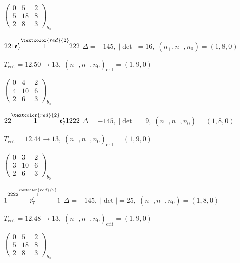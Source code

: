 \documentclass[10pt]{article}
\begin{document}
\hspace{2em}$\left(\begin{smallmatrix}0 & 5 & 2 \\ 5 & 18 & 8 \\ 2 & 8 & 3\end{smallmatrix}\right)_{\!b_0}$

\smallskip

$221\mathfrak{e}_7'\overset{\textcolor{red}{2}}{1}222$ \quad $\Delta=-145,\; |\det|=16,\; (n_+,n_-,n_0)=(1,8,0)$

\hspace{1em}$T_{\text{crit}}=12.50 \to 13,\; (n_+,n_-,n_0)_{\text{crit}}=(1,9,0)$

\hspace{2em}$\left(\begin{smallmatrix}0 & 4 & 2 \\ 4 & 10 & 6 \\ 2 & 6 & 3\end{smallmatrix}\right)_{\!b_0}$

$22\overset{\textcolor{red}{2}}{1}\mathfrak{e}_7'1222$ \quad $\Delta=-145,\; |\det|=9,\; (n_+,n_-,n_0)=(1,8,0)$

\hspace{1em}$T_{\text{crit}}=12.44 \to 13,\; (n_+,n_-,n_0)_{\text{crit}}=(1,9,0)$

\hspace{2em}$\left(\begin{smallmatrix}0 & 3 & 2 \\ 3 & 10 & 6 \\ 2 & 6 & 3\end{smallmatrix}\right)_{\!b_0}$

\smallskip

$1\overset{2222\overset{\textcolor{red}{2}}{1}}{\mathfrak{e}_7'}1$ \quad $\Delta=-145,\; |\det|=25,\; (n_+,n_-,n_0)=(1,8,0)$

\hspace{1em}$T_{\text{crit}}=12.48 \to 13,\; (n_+,n_-,n_0)_{\text{crit}}=(1,9,0)$

\hspace{2em}$\left(\begin{smallmatrix}0 & 5 & 2 \\ 5 & 18 & 8 \\ 2 & 8 & 3\end{smallmatrix}\right)_{\!b_0}$

\smallskip
\end{document}
